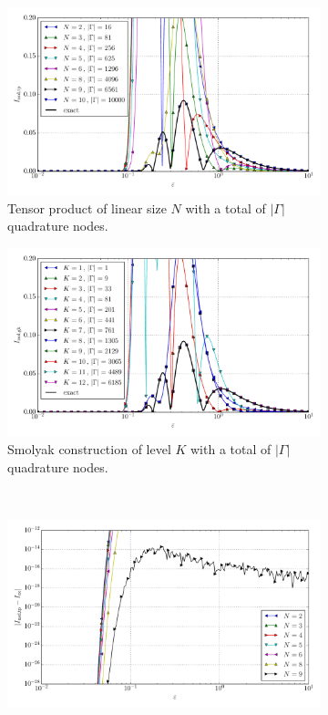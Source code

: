 \documentclass[a4paper,10pt]{article}
\begin{document}
\begin{figure}[ht!]
  \begin{subfigure}[t]{0.5\linewidth}
    \includegraphics[width=\linewidth]{./plots/tp_sg_4d_conv_eps_(8,0,1,0)_(8,1,0,0)_val_nsd_tp.pdf}
    \caption{Tensor product of linear size $N$ with a total of $|\Gamma|$ quadrature nodes.}
    \label{fig:tp_sg_4d_conv_eps_8010_8100_val_nsd_tp}
  \end{subfigure}
  \begin{subfigure}[t]{0.5\linewidth}
    \includegraphics[width=\linewidth]{./plots/tp_sg_4d_conv_eps_(8,0,1,0)_(8,1,0,0)_val_nsd_gk.pdf}
    \caption{Smolyak construction of level $K$ with a total of $|\Gamma|$ quadrature nodes.}
    \label{fig:tp_sg_4d_conv_eps_8010_8100_val_nsd_gk}
  \end{subfigure} \\
  \begin{subfigure}[t]{0.5\linewidth}
    \includegraphics[width=\linewidth]{./plots/tp_sg_4d_conv_eps_(8,0,1,0)_(8,1,0,0)_err_nsd_tp.pdf}

\end{subfigure}
\end{figure}
\end{document}
